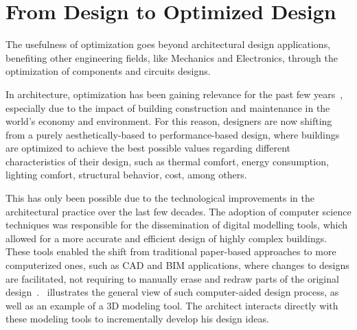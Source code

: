 \section{From Design to Optimized Design}
	
	The usefulness of optimization goes beyond architectural design applications, benefiting other engineering fields, like Mechanics and Electronics, through the optimization of components and circuits designs. 
	
	In architecture, optimization has been gaining relevance for the past few years~\cite{Cichocka2017SURVEY}, especially due to the impact of building construction and maintenance in the world's economy and environment. For this reason, designers are now shifting from a purely aesthetically-based to performance-based design, where buildings are optimized to achieve the best possible values regarding different characteristics of their design, such as thermal comfort, energy consumption, lighting comfort, structural behavior, cost, among others.

	This has only been possible due to the technological improvements in the architectural practice over the last few decades. The adoption of computer science techniques was responsible for the dissemination of digital modelling tools, which allowed for a more accurate and efficient design of highly complex buildings. These tools enabled the shift from traditional paper-based approaches to more computerized ones, such as \ac{CAD} and \ac{BIM} applications, where changes to designs are facilitated, not requiring to manually erase and redraw parts of the original design~\cite{Ferreira2015GD}.~ illustrates the general view of such computer-aided design process, as well as an example of a 3D modeling tool. The architect interacts directly with these modeling tools to incrementally develop his design ideas.
	
